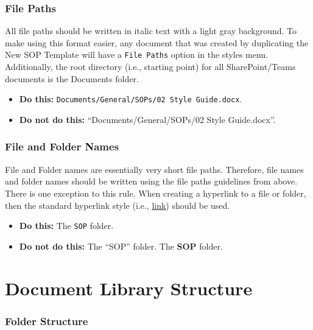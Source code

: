 \documentclass[
  letterpaper,
  DIV=11,
  numbers=noendperiod]{scrreprt}
\providecommand{\tightlist}{%
  \setlength{\itemsep}{0pt}\setlength{\parskip}{0pt}}\usepackage{longtable,booktabs,array}
\begin{document}
\subsection{File Paths}\label{file-paths}

All file paths should be written in italic text with a light gray
background. To make using this format easier, any document that was
created by duplicating the New SOP Template will have a
\texttt{File\ Paths} option in the styles menu. Additionally, the root
directory (i.e., starting point) for all SharePoint/Teams documents is
the Documents folder.

\begin{itemize}
\tightlist
\item
  \textbf{Do this:}
  \texttt{Documents/General/SOPs/02\ Style\ Guide.docx}.
\item
  \textbf{Do not do this:} ``Documents/General/SOPs/02 Style
  Guide.docx''.
\end{itemize}

\subsection{File and Folder Names}\label{file-and-folder-names}

File and Folder names are essentially very short file paths. Therefore,
file names and folder names should be written using the file paths
guidelines from above. There is one exception to this rule. When
creating a hyperlink to a file or folder, then the standard hyperlink
style (i.e., \href{}{link}) should be used.

\begin{itemize}
\tightlist
\item
  \textbf{Do this:} The \texttt{SOP} folder.
\item
  \textbf{Do not do this:} The ``SOP'' folder. The \textbf{SOP} folder.
\end{itemize}

\chapter{Document Library Structure}\label{sec-doc_lib_structure}

\subsection{Folder Structure}\label{folder-structure}
\end{document}
